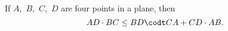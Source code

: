 If $A$,~$B$,~$C$,~$D$ are four points in a plane, then
\[
AD \cdot BC \leq BD \codt CA + CD \cdot AB.
\]

